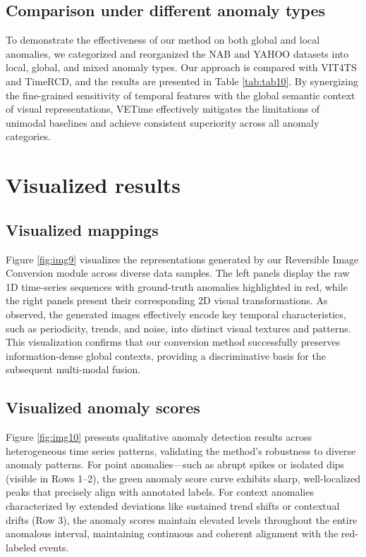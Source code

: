 \documentclass{article}
\theoremstyle{plain}
\theoremstyle{definition}
\theoremstyle{remark}
\begin{document}
\subsection{Comparison under different anomaly types}\label{appendix:C3}
To demonstrate the effectiveness of our method on both global and local anomalies, we categorized and reorganized the NAB and YAHOO datasets into local, global, and mixed anomaly types. Our approach is compared with VIT4TS and TimeRCD, and the results are presented in Table \ref{tab:tab10}. By synergizing the fine-grained sensitivity of temporal features with the global semantic context of visual representations, VETime effectively mitigates the limitations of unimodal baselines and achieve consistent superiority across all anomaly categories.

\section{Visualized results}\label{appendix:D}
\label{appendix:D2}
\subsection{Visualized mappings}\label{appendix:D1}
Figure \ref{fig:img9} visualizes the representations generated by our Reversible Image Conversion module across diverse data samples. The left panels display the raw 1D time-series sequences with ground-truth anomalies highlighted in red, while the right panels present their corresponding 2D visual transformations. As observed, the generated images effectively encode key temporal characteristics, such as periodicity, trends, and noise, into distinct visual textures and patterns. This visualization confirms that our conversion method successfully preserves information-dense global contexts, providing a discriminative basis for the subsequent multi-modal fusion.


\subsection{Visualized anomaly scores}
Figure \ref{fig:img10} presents qualitative anomaly detection results across heterogeneous time series patterns, validating the method's robustness to diverse anomaly patterns. For point anomalies—such as abrupt spikes or isolated dips (visible in Rows 1–2), the green anomaly score curve exhibits sharp, well-localized peaks that precisely align with annotated labels. For context anomalies characterized by extended deviations like sustained trend shifts or contextual drifts (Row 3), the anomaly scores maintain elevated levels throughout the entire anomalous interval, maintaining continuous and coherent alignment with the red-labeled events.



\end{document}
